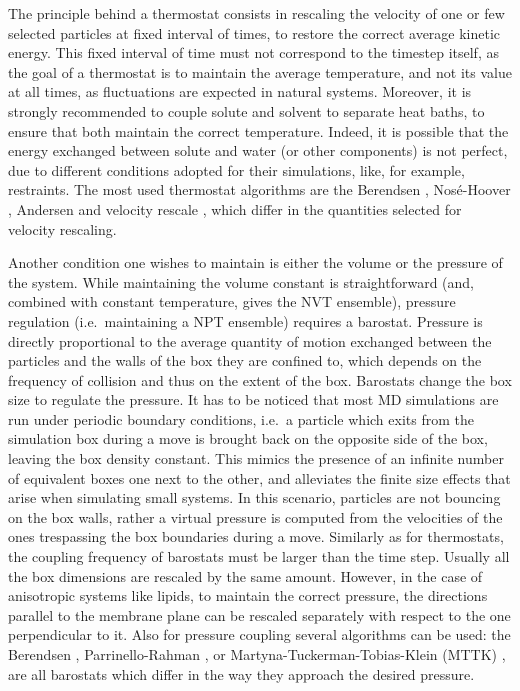 The principle behind a thermostat consists in rescaling the velocity of one or few selected particles at fixed interval of times, to restore the correct average kinetic energy. This fixed interval of time must not correspond to the timestep itself, as the goal of a thermostat is to maintain the average temperature, and not its value at all times, as fluctuations are expected in natural systems.
%
Moreover, it is strongly recommended to couple solute and solvent to separate heat baths, to ensure that both maintain the correct temperature. Indeed, it is possible that the energy exchanged between solute and water (or other components) is not perfect, due to different conditions adopted for their simulations, like, for example, restraints.
%
The most used thermostat algorithms are the Berendsen \citep{Berendsen1984}, Nos\'{e}-Hoover \citep{Nose1983,Hoover1985}, Andersen \citep{Andersen1980} and velocity rescale \citep{Bussi2007}, which differ in the quantities selected for velocity rescaling.

Another condition one wishes to maintain is either the volume or the pressure of the system. While maintaining the volume constant is straightforward (and, combined with constant temperature, gives the NVT ensemble), pressure regulation (i.e.\ maintaining a NPT ensemble) requires a barostat.
%
Pressure is directly proportional to the average quantity of motion exchanged between the particles and the walls of the box they are confined to, which depends on the frequency of collision and thus on the extent of the box. Barostats change the box size to regulate the pressure.
%
It has to be noticed that most MD simulations are run under periodic boundary conditions, i.e.\ a particle which exits from the simulation box during a move is brought back on the opposite side of the box, leaving the box density constant. This mimics the presence of an infinite number of equivalent boxes one next to the other, and alleviates the finite size effects that arise when simulating small systems.
%
In this scenario, particles are not bouncing on the box walls, rather a virtual pressure is computed from the velocities of the ones trespassing the box boundaries during a move.
%
Similarly as for thermostats, the coupling frequency of barostats must be larger than the time step. Usually all the box dimensions are rescaled by the same amount. However, in the case of anisotropic systems like lipids, to maintain the correct pressure, the directions parallel to the membrane plane can be rescaled separately with respect to the one perpendicular to it.
%
Also for pressure coupling several algorithms can be used: the Berendsen \citep{Berendsen1984}, Parrinello-Rahman \citep{Parrinello1981}, or Martyna-Tuckerman-Tobias-Klein (MTTK) \citep{Martyna1996}, are all barostats which differ in the way they approach the desired pressure.


